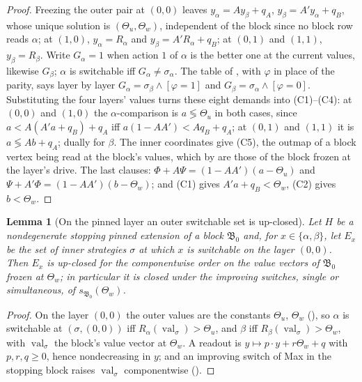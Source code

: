 \documentclass[11pt]{article}
\theoremstyle{plain}
\newtheorem{lemma}[theorem]{Lemma}
\theoremstyle{definition}
\DeclareMathOperator{\val}{val}
\begin{document}
\begin{proof}
Freezing the outer pair at $(0,0)$ leaves $y_\alpha=Ay_\beta+q_A$,
$y_\beta=A'y_\alpha+q_B$, whose unique solution is $(\Theta_u,\Theta_w)$,
independent of the block since no block row reads $\alpha$; at $(1,0)$,
$y_\alpha=R_\alpha$ and $y_\beta=A'R_\alpha+q_B$; at $(0,1)$ and $(1,1)$,
$y_\beta=R_\beta$. Write $G_\alpha=1$ when action $1$ of $\alpha$ is the
better one at the current values, likewise $G_\beta$; $\alpha$ is switchable
iff $G_\alpha\ne\sigma_\alpha$. The table of , with
$\varphi$ in place of the parity, says layer by layer
$G_\alpha=\sigma_\beta\wedge[\varphi=1]$ and
$G_\beta=\sigma_\alpha\wedge[\varphi=0]$. Substituting the four layers'
values turns these eight demands into (C1)--(C4): at $(0,0)$ and $(1,0)$
the $\alpha$-comparison is $a\lessgtr\Theta_u$ in both cases, since
$a<A(A'a+q_B)+q_A$ iff $a(1-AA')<Aq_B+q_A$; at $(0,1)$ and $(1,1)$ it is
$a\lessgtr Ab+q_A$; dually for $\beta$. The inner coordinates give (C5),
the outmap of a block vertex being read at the block's values, which by
 are those of the block frozen at the layer's drive. The
last clauses: $\Phi+A\Psi=(1-AA')(a-\Theta_u)$ and
$\Psi+A'\Phi=(1-AA')(b-\Theta_w)$; and (C1) gives $A'a+q_B<\Theta_w$, (C2)
gives $b<\Theta_w$.
\end{proof}

\begin{lemma}[On the pinned layer an outer switchable set is up-closed]\label{lem:pinned-upclosed}
Let $H$ be a nondegenerate stopping pinned extension of a block
$\mathfrak B_0$ and, for $x\in\{\alpha,\beta\}$, let $E_x$ be the set of
inner strategies $\sigma$ at which $x$ is switchable on the layer $(0,0)$.
Then $E_x$ is up-closed for the componentwise order on the value vectors
of $\mathfrak B_0$ frozen at $\Theta_w$; in particular it is closed under
the improving switches, single or simultaneous, of $s_{\mathfrak B_0}(\Theta_w)$.
\end{lemma}

\begin{proof}
On the layer $(0,0)$ the outer values are the constants $\Theta_u$,
$\Theta_w$ (), so $\alpha$ is switchable at
$(\sigma,(0,0))$ iff $R_\alpha(\val_\sigma)>\Theta_u$, and $\beta$ iff
$R_\beta(\val_\sigma)>\Theta_w$, with $\val_\sigma$ the block's value vector
at $\Theta_w$. A readout is $y\mapsto p\cdot y+r\Theta_w+q$ with
$p,r,q\ge0$, hence nondecreasing in $y$; and an improving switch of Max in
the stopping block raises $\val_\sigma$ componentwise ().
\end{proof}
\end{document}
